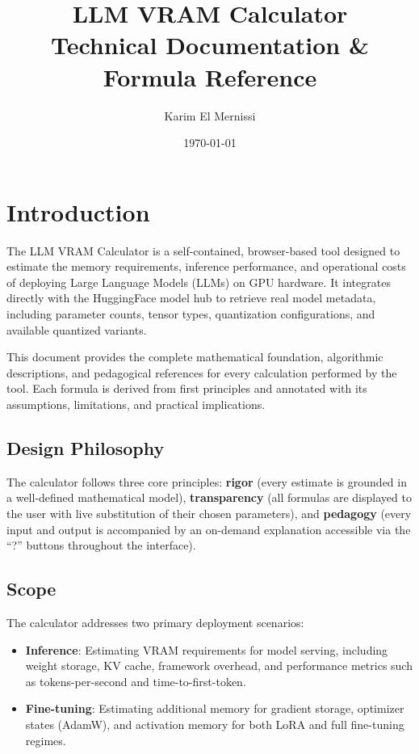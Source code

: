 \documentclass[11pt,a4paper]{article}
\title{LLM VRAM Calculator\\[0.3em]\large Technical Documentation \& Formula Reference}
\author{Karim El Mernissi}
\date{\today}
\theoremstyle{definition}
\begin{document}
\tableofcontents
\newpage

\section{Introduction}

The LLM VRAM Calculator is a self-contained, browser-based tool designed to estimate the memory requirements, inference performance, and operational costs of deploying Large Language Models (LLMs) on GPU hardware. It integrates directly with the HuggingFace model hub to retrieve real model metadata, including parameter counts, tensor types, quantization configurations, and available quantized variants.

This document provides the complete mathematical foundation, algorithmic descriptions, and pedagogical references for every calculation performed by the tool. Each formula is derived from first principles and annotated with its assumptions, limitations, and practical implications.

\subsection{Design Philosophy}

The calculator follows three core principles: \textbf{rigor} (every estimate is grounded in a well-defined mathematical model), \textbf{transparency} (all formulas are displayed to the user with live substitution of their chosen parameters), and \textbf{pedagogy} (every input and output is accompanied by an on-demand explanation accessible via the ``?'' buttons throughout the interface).

\subsection{Scope}

The calculator addresses two primary deployment scenarios:
\begin{itemize}
  \item \textbf{Inference}: Estimating VRAM requirements for model serving, including weight storage, KV cache, framework overhead, and performance metrics such as tokens-per-second and time-to-first-token.
  \item \textbf{Fine-tuning}: Estimating additional memory for gradient storage, optimizer states (AdamW), and activation memory for both LoRA and full fine-tuning regimes.
\end{itemize}
\end{document}
